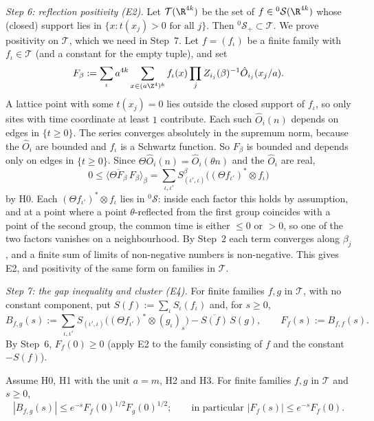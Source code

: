 \emph{Step 6: reflection positivity (E2).} Let $\mathcal T(\R^{4k})$ be the set of $f\in{}^0\mathcal S(\R^{4k})$ whose (closed) support lies in $\{x: t(x_j)>0\text{ for all }j\}$. Then ${}^0\mathcal S_+\subset\mathcal T$. We prove positivity on $\mathcal T$, which we need in Step~7. Let $f=(f_\iota)$ be a finite family with $f_\iota\in\mathcal T$ (and a constant for the empty tuple), and set
\[
  F_\beta:=\sum_\iota a^{4k}\sum_{x\in(a\Z^4)^k}f_\iota(x)\prod_{j}Z_{i_j}(\beta)^{-1}\hat O_{i_j}(x_j/a).
\]
A lattice point with some $t(x_j)=0$ lies outside the closed support of $f_\iota$, so only sites with time coordinate at least $1$ contribute. Each such $\hat O_i(n)$ depends on edges in $\{t\ge0\}$. The series converges absolutely in the supremum norm, because the $\hat O_i$ are bounded and $f_\iota$ is a Schwartz function. So $F_\beta$ is bounded and depends only on edges in $\{t\ge0\}$. Since $\Theta\hat O_i(n)=\hat O_i(\theta n)$ and the $\hat O_i$ are real,
\[
  0\le\langle\overline{\Theta F_\beta}\,F_\beta\rangle_\beta=\sum_{\iota,\iota'}S^\beta_{(\iota',\iota)}\bigl((\Theta f_{\iota'})^*\otimes f_\iota\bigr)
\]
by H0. Each $(\Theta f_{\iota'})^*\otimes f_\iota$ lies in ${}^0\mathcal S$: inside each factor this holds by assumption, and at a point where a point $\theta$-reflected from the first group coincides with a point of the second group, the common time is either $\le0$ or $>0$, so one of the two factors vanishes on a neighbourhood. By Step~2 each term converges along $\beta_j$, and a finite sum of limits of non-negative numbers is non-negative. This gives E2, and positivity of the same form on families in $\mathcal T$.

\emph{Step 7: the gap inequality and cluster (E4).} For finite families $f,g$ in $\mathcal T$, with no constant component, put $S(f):=\sum_\iota S_\iota(f_\iota)$ and, for $s\ge0$,
\[
  B_{f,g}(s):=\sum_{\iota,\iota'}S_{(\iota',\iota)}\bigl((\Theta f_{\iota'})^*\otimes(g_\iota)_s\bigr)-\overline{S(f)}\,S(g),\qquad F_f(s):=B_{f,f}(s).
\]
By Step~6, $F_f(0)\ge0$ (apply E2 to the family consisting of $f$ and the constant $-S(f)$).

\begin{lemma}\label{red:gap}
Assume H0, H1 with the unit $a=m$, H2 and H3. For finite families $f,g$ in $\mathcal T$ and $s\ge0$,
\[
  |B_{f,g}(s)|\le e^{-s}F_f(0)^{1/2}F_g(0)^{1/2};\qquad\text{in particular }|F_f(s)|\le e^{-s}F_f(0).
\]
\end{lemma}

